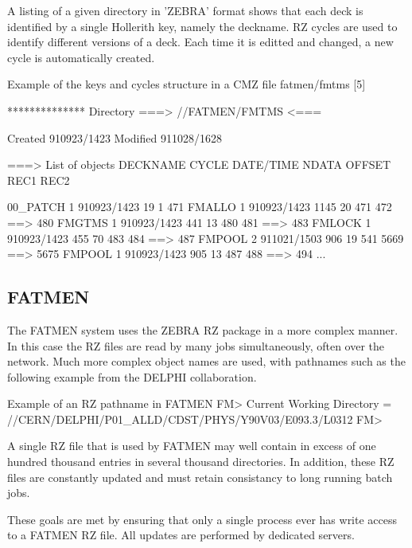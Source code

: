A listing of a given directory in 'ZEBRA' format shows that each deck
is identified by a single Hollerith key, namely the deckname.
RZ cycles are used to identify different versions of a deck. Each
time it is editted and changed, a new cycle is automatically 
created.

\finalnewpage

\begin{XMPt}{Example of the keys and cycles structure in a CMZ file}
 fatmen/fmtms [5] 

 ************** Directory ===> //FATMEN/FMTMS <===

                  Created 910923/1423  Modified 911028/1628

 ===> List of objects 
     DECKNAME      CYCLE   DATE/TIME   NDATA OFFSET   REC1    REC2     

     00_PATCH         1   910923/1423     19      1    471    
     FMALLO           1   910923/1423   1145     20    471     472 ==> 480   
     FMGTMS           1   910923/1423    441     13    480     481 ==> 483   
     FMLOCK           1   910923/1423    455     70    483     484 ==> 487   
     FMPOOL           2   911021/1503    906     19    541    5669 ==> 5675   
     FMPOOL           1   910923/1423    905     13    487     488 ==> 494
 ...
\end{XMPt}

\subsection{FATMEN}

The FATMEN system uses the ZEBRA RZ package in a more complex manner.
In this case the RZ files are read by many jobs simultaneously,
often over the network. Much more complex object names are used,
with pathnames such as the following example from the DELPHI 
collaboration. 

\begin{XMPt}{Example of an RZ pathname in FATMEN}
FM> 
Current Working Directory = //CERN/DELPHI/P01_ALLD/CDST/PHYS/Y90V03/E093.3/L0312
FM>
\end{XMPt}

A single RZ file that is used by FATMEN may well
contain in excess of one hundred thousand 
entries in several thousand directories.
In addition, these RZ files are constantly updated and must
retain consistancy to long running batch jobs.

These goals are met by ensuring that only a single process ever
has write access to a FATMEN RZ file. All updates are performed
by dedicated servers.

